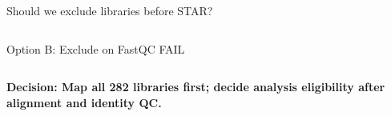 \documentclass[10pt,aspectratio=169]{beamer}
\begin{document}
\begin{frame}{Should we exclude libraries before STAR?}
\begin{columns}[T]
\begin{block}{Option B: Exclude on FastQC FAIL}
		\end{block}
		
	\end{columns}
	
	\vspace{0.16cm}
	
	\begin{center}
		\textbf{
			Decision: Map all 282 libraries first;
			decide analysis eligibility after alignment and identity QC.
		}
	\end{center}
	
\end{frame}


\end{document}
